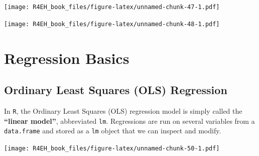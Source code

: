 \documentclass[]{book}
\newenvironment{Shaded}{\begin{snugshade}}{\end{snugshade}}
\newcommand{\KeywordTok}[1]{\textcolor[rgb]{0.13,0.29,0.53}{\textbf{#1}}}
\newcommand{\DataTypeTok}[1]{\textcolor[rgb]{0.13,0.29,0.53}{#1}}
\newcommand{\DecValTok}[1]{\textcolor[rgb]{0.00,0.00,0.81}{#1}}
\newcommand{\FloatTok}[1]{\textcolor[rgb]{0.00,0.00,0.81}{#1}}
\newcommand{\StringTok}[1]{\textcolor[rgb]{0.31,0.60,0.02}{#1}}
\newcommand{\CommentTok}[1]{\textcolor[rgb]{0.56,0.35,0.01}{\textit{#1}}}
\newcommand{\OperatorTok}[1]{\textcolor[rgb]{0.81,0.36,0.00}{\textbf{#1}}}
\newcommand{\NormalTok}[1]{#1}
\theoremstyle{definition}
\theoremstyle{definition}
\theoremstyle{definition}
\theoremstyle{remark}
\begin{document}
\texttt{[image: R4EH\_book\_files/figure-latex/unnamed-chunk-47-1.pdf]}

\texttt{[image: R4EH\_book\_files/figure-latex/unnamed-chunk-48-1.pdf]}

\chapter{Regression Basics}\label{regression-basics}

\section{Ordinary Least Squares (OLS)
Regression}\label{ordinary-least-squares-ols-regression}

In \texttt{R}, the Ordinary Least Squares (OLS) regression model is
simply called the \textbf{``linear model''}, abbreviated \texttt{lm}.
Regressions are run on several variables from a \texttt{data.frame} and
stored as a \texttt{lm} object that we can inspect and modify.

\begin{Shaded}
\end{Shaded}

\texttt{[image: R4EH\_book\_files/figure-latex/unnamed-chunk-50-1.pdf]}
\end{document}
